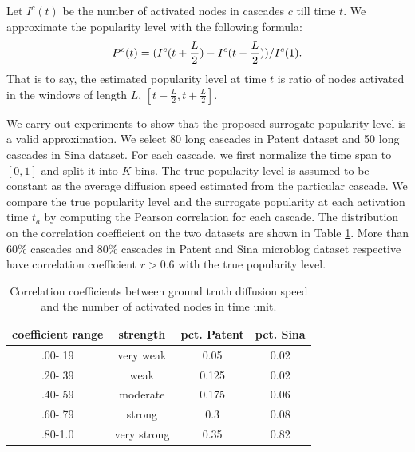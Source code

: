 Let $I^c(t)$ be the number of activated nodes in cascades $c$ till time $t$. We approximate the popularity level with the following formula:
$$
P^c(t) = (I^c(t+\frac{L}{2}) - I^c(t-\frac{L}{2})) / I^c(1).
$$
That is to say, the estimated popularity level at time $t$ is ratio of nodes activated in the windows of length $L$, $[t-\frac{L}{2}, t+\frac{L}{2}]$. 

We carry out experiments to show that the proposed surrogate popularity level is a valid approximation. We select 80 long cascades in Patent dataset and 50 long cascades in Sina dataset. For each cascade, we first normalize the time span to $[0,1]$ and split it into $K$ bins. The true popularity level is assumed to be constant as the average diffusion speed estimated from the particular cascade. We compare the true popularity level and the surrogate popularity at each activation time $t_a$ by computing the Pearson correlation for each cascade. The distribution on the correlation coefficient on the two datasets are shown in Table \ref{tab:Corre}. More than 60\% cascades and 80\% cascades in Patent and Sina microblog dataset respective have correlation coefficient $r>0.6$ with the true popularity level.   


\begin{table}[H]
\caption{Correlation coefficients between ground truth diffusion speed and the number of activated nodes in time unit.}
\begin{tabular}{c|c|c|c}
 coefficient range & strength & pct. Patent & pct. Sina \\
\hline
.00-.19 & very weak & 0.05 & 0.02\\
.20-.39 & weak & 0.125 & 0.02\\
.40-.59 & moderate & 0.175 & 0.06\\
.60-.79 & strong & 0.3 & 0.08\\
.80-1.0 & very strong & 0.35 & 0.82\\
\end{tabular}\label{tab:Corre}
\end{table}